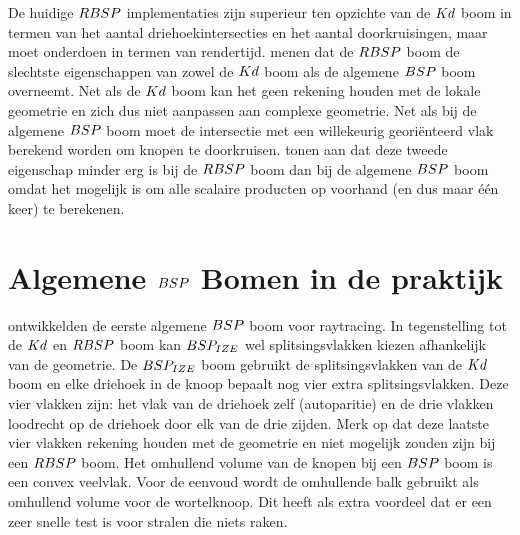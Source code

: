     De huidige $RBSP$ implementaties zijn superieur ten opzichte van de $Kd$ boom in termen van het aantal driehoekintersecties en het aantal doorkruisingen, maar moet onderdoen in termen van rendertijd.
    \authorIze{} \cite{ize} menen dat de $RBSP$ boom de slechtste eigenschappen van zowel de $Kd$ boom als de algemene $BSP$ boom overneemt. 
    Net als de $Kd$ boom kan het geen rekening houden met de lokale geometrie en zich dus niet aanpassen aan complexe geometrie.
    Net als bij de algemene $BSP$ boom moet de intersectie met een willekeurig georiënteerd vlak berekend worden om knopen te doorkruisen. \authorBudge{} \cite{Budge} tonen aan dat deze tweede eigenschap minder erg is bij de $RBSP$ boom dan bij de algemene $BSP$ boom omdat het mogelijk is om alle scalaire producten op voorhand (en dus maar één keer) te berekenen.

\section{Algemene $BSP$ Bomen in de praktijk}
    \authorIze{} \cite{ize} ontwikkelden de eerste algemene $BSP$ boom voor raytracing. In tegenstelling tot de $Kd$ en $RBSP$ boom kan $BSP_{IZE}$ wel splitsingsvlakken kiezen afhankelijk van de geometrie. De $BSP_{IZE}$ boom gebruikt de splitsingsvlakken van de $Kd$ boom en elke driehoek in de knoop bepaalt nog vier extra splitsingsvlakken. Deze vier vlakken zijn: het vlak van de driehoek zelf (autoparitie) en de drie vlakken loodrecht op de driehoek door elk van de drie zijden. Merk op dat deze laatste vier vlakken rekening houden met de geometrie en niet mogelijk zouden zijn bij een $RBSP$ boom. Het omhullend volume van de knopen bij een $BSP$ boom is een convex veelvlak.
    Voor de eenvoud wordt de omhullende balk gebruikt als omhullend volume voor de wortelknoop. Dit heeft als extra voordeel dat er een zeer snelle test is voor stralen die niets raken. \\

